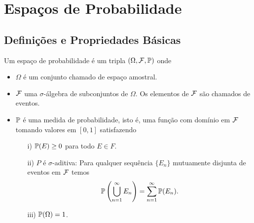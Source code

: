 \chapter[Aula 4]{Espaços de Probabilidade}
\chaptermark{}





\section{Definições e Propriedades Básicas}

Um espaço de probabilidade é um tripla 
$(\Omega,\F,\P)$ onde 
\begin{itemize}
	\item 
	$\Omega$ é um conjunto chamado de espaço amostral.

	\item
	$\F$ uma $\sigma$-álgebra de subconjuntos de $\Omega$.
	Os elementos de $\F$ são chamados de eventos.
	
	\item $\P$ é uma medida de probabilidade, isto é, 
	uma função com domínio em $\F$ tomando valores em 
	$[0,1]$ satisfazendo 
		\begin{itemize}
			\item[i)] 
			$\P(E)\geq 0$ para todo $E\in F$.

			\item[ii)] 
			$P$ é $\sigma$-aditiva: Para qualquer
			sequência $\{E_n\}$ mutuamente disjunta 
			de eventos em $\F$ temos 
				\[
					\P\left( \bigcup_{n=1}^{\infty} E_n \right)
					=
					\sum_{n=1}^{\infty} \P(E_n).
				\]
			\item[iii)] 
			$\P(\Omega)=1$.
		\end{itemize}
\end{itemize}



